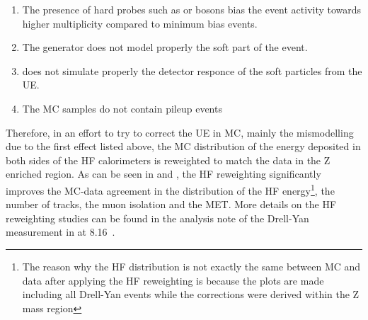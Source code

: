 \begin{enumerate}
 \item The presence of hard probes such as \Z or \W bosons bias the event activity towards higher multiplicity compared to minimum bias events.
 \item The generator does not model properly the soft part of the event.
 \item {} does not simulate properly the detector responce of the soft particles from the UE.
 \item The MC samples do not contain pileup events
\end{enumerate}

Therefore, in an effort to try to correct the UE in MC, mainly the mismodelling due to the first effect listed above, the MC distribution of the energy deposited in both sides of the HF calorimeters is reweighted to match the data in the Z enriched region. As can be seen in  and , the HF reweighting significantly improves the MC-data agreement in the distribution of the HF energy\footnote{The reason why the HF distribution is not exactly the same between MC and data after applying the HF reweighting is because the plots are made including all Drell-Yan events while the corrections were derived within the Z mass region}, the number of tracks, the muon isolation and the MET. More details on the HF reweighting studies can be found in the analysis note of the Drell-Yan measurement in \pPb at 8.16~\TeV \cite{DY_pPb}.

